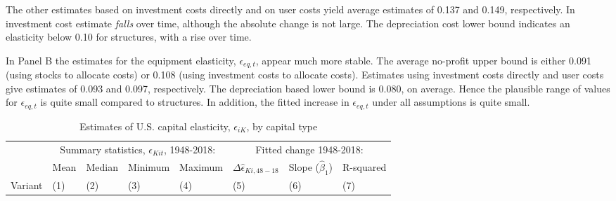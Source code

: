 \documentclass[11pt]{article}
\begin{document}
The other estimates based on investment costs directly and on user costs yield average estimates of 0.137 and 0.149, respectively. In investment cost estimate \textit{falls} over time, although the absolute change is not large. The depreciation cost lower bound indicates an elasticity below 0.10 for structures, with a rise over time. 

In Panel B the estimates for the equipment elasticity, $\epsilon_{eq,t}$, appear much more stable. The average no-profit upper bound is either 0.091 (using stocks to allocate costs) or 0.108 (using investment costs to allocate costs). Estimates using investment costs directly and user costs give estimates of 0.093 and 0.097, respectively. The depreciation based lower bound is 0.080, on average. Hence the plausible range of values for $\epsilon_{eq,t}$ is quite small compared to structures. In addition, the fitted increase in $\epsilon_{eq,t}$ under all assumptions is quite small. 

\begin{table}[!htb]
\begin{center}
\caption{Estimates of U.S. capital elasticity, $\epsilon_{iK}$, by capital type}
\label{TAB_type}
{\footnotesize
\begin{tabularx}{\textwidth}{lXXXXXXX}
\midrule
        & \multicolumn{4}{c}{Summary statistics, $\epsilon_{Kit}$, 1948-2018:}  & \multicolumn{3}{c}{Fitted change 1948-2018:} \\ \cmidrule(lr){2-5} \cmidrule(lr){6-8}
 &  Mean & Median  & Minimum & Maximum  & $\Delta \hat{\epsilon}_{Ki,48-18}$ & Slope ($\hat{\beta}_1$) & R-squared \\
Variant & (1) & (2) & (3) & (4) & (5) & (6) & (7) \\
\midrule

\midrule
\end{tabularx}
}
\end{center}
\vspace{-.5cm}
\end{table}
\end{document}
